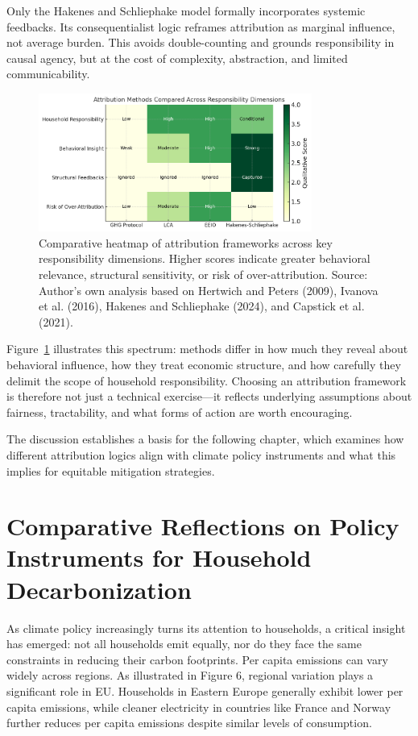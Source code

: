 \documentclass[12pt,a4paper]{article}%
\begin{document}
Only the Hakenes and Schliephake model formally incorporates systemic feedbacks. Its consequentialist logic reframes attribution as marginal influence, not average burden. This avoids double-counting and grounds responsibility in causal agency, but at the cost of complexity, abstraction, and limited communicability.
\begin{figure}[h]
    \centering
    \includegraphics[width=0.8\textwidth]{Heatmap Res.png}
    \caption{\small{Comparative heatmap of attribution frameworks across key responsibility dimensions. Higher scores indicate greater behavioral relevance, structural sensitivity, or risk of over-attribution. Source: Author's own analysis based on Hertwich and Peters (2009), Ivanova et al. (2016), Hakenes and Schliephake (2024), and Capstick et al. (2021).}}\label{fig:heatmap}
\end{figure}
Figure~\ref{fig:heatmap} illustrates this spectrum: methods differ in how much they reveal about behavioral influence, how they treat economic structure, and how carefully they delimit the scope of household responsibility. Choosing an attribution framework is therefore not just a technical exercise—it reflects underlying assumptions about fairness, tractability, and what forms of action are worth encouraging.



\noindent
The discussion establishes a basis for the following chapter, which examines how different attribution logics align with climate policy instruments and what this implies for equitable mitigation strategies.
\section{Comparative Reflections on Policy Instruments for Household Decarbonization}

As climate policy increasingly turns its attention to households, a critical insight has emerged: not all households emit equally, nor do they face the same constraints in reducing their carbon footprints. Per capita emissions can vary widely across regions. As illustrated in Figure 6, regional variation plays a significant role in EU. Households in Eastern Europe generally exhibit lower per capita emissions, while cleaner electricity in countries like France and Norway further reduces per capita emissions despite similar levels of consumption.
\end{document}

